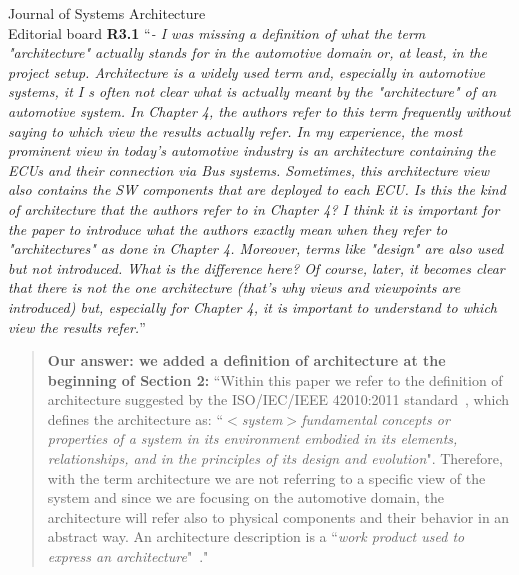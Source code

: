 \documentclass[a4paper,10pt]{letter}
\begin{document}
\begin{letter}{Journal of Systems Architecture\\
    Editorial board}
\textbf{R3.1} ``\textit{- I was missing a definition of what the term "architecture" actually stands for in the automotive domain or, at least, in the project setup. Architecture is a widely used term and, especially in automotive systems, it I s often not clear what is actually meant by the "architecture" of an automotive system. In Chapter 4, the authors refer to this term frequently without saying to which view the results actually refer. In my experience, the most prominent view in today's automotive industry is an architecture containing the ECUs and their connection via Bus systems. Sometimes, this architecture view also contains the SW components that are deployed to each ECU. Is this the kind of architecture that the authors refer to in Chapter 4? I think it is important for the paper to introduce what the authors exactly mean when they refer to "architectures" as done in Chapter 4. Moreover, terms like "design" are also used but not introduced. What is the difference here? Of course,
later, it becomes clear that there is not the one architecture (that's why views and viewpoints are introduced) but, especially for Chapter 4, it is important to understand to which view the results refer.}''
\begin{quote}
\textbf{Our answer: we added a definition of architecture at the beginning of Section 2:}
``Within this paper we refer to the definition of architecture suggested by the ISO/IEC/IEEE 42010:2011 standard~\cite{42010}, which defines the architecture as: ``{\em $<$system$>$fundamental concepts or properties of a system in its environment embodied in its elements,
relationships, and in the principles of its design and evolution}". Therefore, with the term architecture we are not referring to a specific view of the system and since we are focusing on the automotive domain, the architecture will refer also to physical components and their behavior in an abstract way. An architecture description is a ``{\em work product used to express an architecture}"~\cite{42010}."
\end{quote}


\end{letter}
\end{document}
